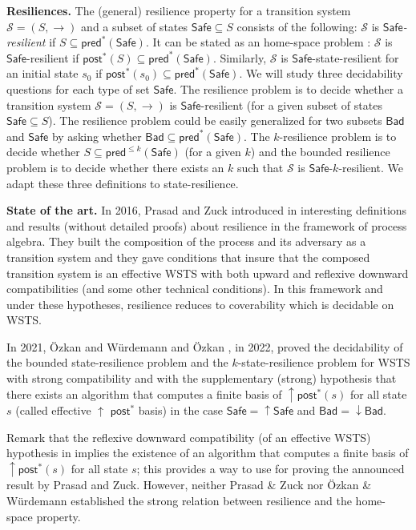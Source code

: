 \documentclass[runningheads]{llncs}
\newcommand{\pred}{\textsf{pred}}
\newcommand{\post}{\textsf{post}}
\newcommand{\Bad}{\textsf{Bad}}
\newcommand{\Safe}{\textsf{Safe}}
\begin{document}
{\bf Resiliences.}  
The (general) resilience property for a transition system $\mathscr{S} = (S,\rightarrow )$ and a subset of states $\Safe \subseteq S$ consists of the following: $\mathscr{S}$ is {\em $\Safe$-resilient} if
$S \subseteq \pred^*(\Safe)$. It 
can be stated as an home-space problem : $\mathscr{S}$ is $\Safe$-resilient if $\post^*(S) \subseteq \pred^*(\Safe)$.
Similarly, $\mathscr{S}$ is $\Safe$-state-resilient for an initial state $s_0$ if  
$\post^*(s_0) \subseteq \pred^*(\Safe)$.
We will study three decidability questions for each type of set $\Safe$.
The resilience problem is to decide whether a transition system $\mathscr{S} = (S,\rightarrow )$ is $\Safe$-resilient (for a given subset of states $\Safe \subseteq S$).
The resilience problem could be easily generalized for two subsets $\Bad$ and $\Safe$ by asking
whether $\Bad \subseteq \pred^*(\Safe)$.
The $k$-resilience problem is to decide whether $S \subseteq \pred^{\leq k}(\Safe)$ (for a given $k$) and 
the bounded resilience problem is to decide whether there exists an $k$ such that $\mathscr{S}$ is $\Safe$-$k$-resilient. We adapt these three definitions to state-resilience.


{\bf State of the art.}
In 2016, Prasad and Zuck introduced in  \cite{DBLP:journals/corr/PrasadZ16} interesting definitions and results (without detailed proofs) about resilience in the framework of process algebra. They built the composition of the process and its adversary as a transition system and they gave conditions that insure that the composed transition system is an effective WSTS with both upward and reflexive downward compatibilities (and some other technical conditions). In this framework and under these hypotheses, resilience reduces to coverability which is decidable on WSTS. 

In 2021, \"Ozkan and Würdemann  \cite{DBLP:journals/corr/abs-2108-00889} and \"Ozkan \cite{DBLP:conf/gg/Ozkan22}, in 2022, proved the decidability of the bounded state-resilience problem and the $k$-state-resilience problem for WSTS  with strong compatibility and with the supplementary (strong) hypothesis that there exists an algorithm that computes a finite basis of $\uparrow \post^*(s)$ for all state $s$ (called effective 
$\uparrow$ $\post^*$ basis) in the case $\Safe=\uparrow \Safe$ and $\Bad = \downarrow \Bad$.


Remark that the reflexive downward compatibility (of an effective WSTS) hypothesis in  \cite{DBLP:journals/corr/PrasadZ16} implies the existence of an algorithm that computes a finite basis of $\uparrow \post^*(s)$ for all state $s$; this provides a way to use \cite{DBLP:journals/corr/abs-2108-00889} for proving the announced result by Prasad and Zuck.
However, neither Prasad \& Zuck nor \"Ozkan \& Würdemann established the strong relation between resilience and the home-space property.
%
\end{document}
